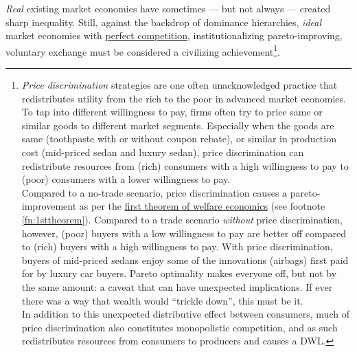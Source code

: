 \emph{Real} existing market economies have sometimes --- but not always --- created sharp inequality. Still, against the backdrop of dominance hierarchies, \emph{ideal} market economies with \hyperref[fn:perfect-competition]{perfect competition}, institutionalizing pareto-improving, voluntary exchange must be considered a civilizing achievement\footnote{
	\emph{Price discrimination} strategies are one often unacknowledged practice that redistributes utility from the rich to the poor in advanced market economies. To tap into different willingness to pay, firms often try to price same or similar goods to different market segments. Especially when the goods are same (toothpaste with or without coupon rebate), or similar in production cost (mid-priced sedan and luxury sedan), price discrimination can redistribute resources from (rich) consumers with a high willingness to pay to (poor) consumers with a lower willingness to pay.\\
	Compared to a no-trade scenario, price discrimination causes a pareto-improvement as per the \hyperref[fn:1sttheorem]{first theorem of welfare economics} (see footnote \ref{fn:1sttheorem}). Compared to a trade scenario \emph{without} price discrimination, however, (poor) buyers with a low willingness to pay are better off compared to (rich) buyers with a high willingness to pay. With price discrimination, buyers of mid-priced sedans enjoy some of the innovations (airbags) first paid for by luxury car buyers. Pareto optimality makes everyone off, but not by the same amount: a caveat that can have unexpected implications. If ever there was a way that wealth would ``trickle down'', this must be it.\\
	In addition to this unexpected distributive effect between consumers, much of price discrimination also constitutes monopolistic competition, and as such redistributes resources from consumers to producers and causes a \gls{DWL}.}.%

